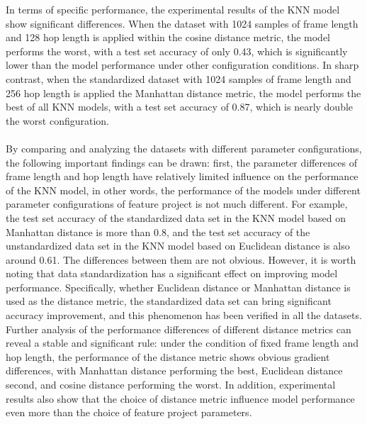 \noindent In terms of specific performance, the experimental results of the KNN model show significant differences. When the dataset with 1024 samples of frame length and 128 hop length is applied within the cosine distance metric, the model performs the worst, with a test set accuracy of only 0.43, which is significantly lower than the model performance under other configuration conditions. In sharp contrast, when the standardized dataset with 1024 samples of frame length and 256 hop length is applied the Manhattan distance metric, the model performs the best of all KNN models, with a test set accuracy of 0.87, which is nearly double the worst configuration.\\
\\
By comparing and analyzing the datasets with different parameter configurations, the following important findings can be drawn: first, the parameter differences of frame length and hop length have relatively limited influence on the performance of the KNN model, in other words, the performance of the models under different parameter configurations of feature project is not much different. For example, the test set accuracy of the standardized data set in the KNN model based on Manhattan distance is more than 0.8, and the test set accuracy of the unstandardized data set in the KNN model based on Euclidean distance is also around 0.61. The differences between them are not obvious. However, it is worth noting that data standardization has a significant effect on improving model performance. Specifically, whether Euclidean distance or Manhattan distance is used as the distance metric, the standardized data set can bring significant accuracy improvement, and this phenomenon has been verified in all the datasets. Further analysis of the performance differences of different distance metrics can reveal a stable and significant rule: under the condition of fixed frame length and hop length, the performance of the distance metric shows obvious gradient differences, with Manhattan distance performing the best, Euclidean distance second, and cosine distance performing the worst. In addition, experimental results also show that the choice of distance metric influence model performance even more than the choice of feature project parameters.\\
\\
